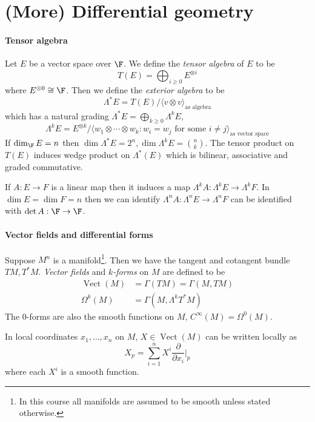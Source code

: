 \documentclass[a4paper]{article}
\DeclareMathOperator{\Vect}{Vect} %
\begin{document}
\section{(More) Differential geometry}

\paragraph{Tensor algebra}

Let \(E\) be a vector space over \(\F\). We define the \emph{tensor algebra} of \(E\) to be
\[
  T(E) = \bigoplus_{i \geq 0} E^{\otimes i}
\]
where \(E^{\otimes 0} \cong \F\). Then we define the \emph{exterior algebra} to be
\[
  \Lambda^*E = T(E)/\langle v \otimes v \rangle_{\text{as algebra}}
\]
which has a natural grading \(\Lambda^*E = \bigoplus_{k \geq 0} \Lambda^kE\),
\[
  \Lambda^kE = E^{\otimes k}/\langle w_1 \otimes \cdots \otimes w_k: w_i = w_j \text{ for some } i \ne j \rangle_{\text{as vector space}}
\]
If \(\dim_\F E = n\) then \(\dim \Lambda^*E = 2^n, \dim \Lambda^kE = \binom{n}{k}\). The tensor product on \(T(E)\) induces wedge product on \(\Lambda^*(E)\) which is bilinear, associative and graded commutative.

If \(A: E \to F\) is a linear map then it induces a map \(\Lambda^k A: \Lambda^k E \to \Lambda^k F\). In \(\dim E = \dim F = n\) then we can identify \(\Lambda^nA: \Lambda^nE \to \Lambda^nF\) can be identified with \(\det A: \F \to \F\).

\paragraph{Vector fields and differential forms}

Suppose \(M^n\) is a manifold\footnote{In this course all manifolds are assumed to be smooth unless stated otherwise.}. Then we have the tangent and cotangent bundle \(TM, T^*M\). \emph{Vector fields} and \emph{\(k\)-forms} on \(M\) are defined to be
\begin{align*}
  \Vect(M) &= \Gamma(TM) = \Gamma(M, TM) \\
  \Omega^k(M) &= \Gamma(M, \Lambda^kT^*M)
\end{align*}
The \(0\)-forms are also the smooth functions on \(M\), \(C^\infty(M) = \Omega^0(M)\).

In local coordinates \(x_1, \dots, x_n\) on \(M\), \(X \in \Vect(M)\) can be written locally as
\[
  X_p = \sum_{i = 1}^n X^i \frac{\partial  }{\partial x_i}|_p
\]
where each \(X^i\) is a smooth function.
\end{document}
